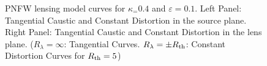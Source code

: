 \begin{figure}[!ht]
\caption{\label{pnfw_curves_pm-1} PNFW lensing model curves for $\kappa_=0.4$
and $\varepsilon=0.1$. Left Panel: Tangential Caustic and Constant Distortion in
the source plane. Right Panel: Tangential Caustic and Constant Distortion in the
lens plane. ($R_\lambda=\infty$: Tangential Curves. $R_\lambda=\pm R_{\rm th}$:
Constant Distortion Curves for $R_{\rm th}=5$)}
\end{figure}


